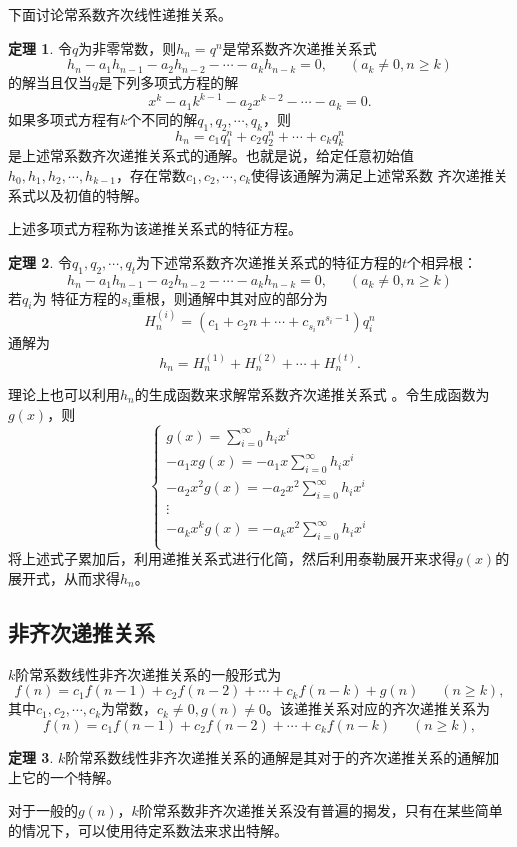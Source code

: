 \documentclass[a4paper,11pt]{article}%
\theoremstyle{remark}
\theoremstyle{remark}
\theoremstyle{definition}
\newtheorem{theorem}{定理}[section]
\theoremstyle{definition}
\theoremstyle{definition}
\begin{document}
下面讨论常系数齐次线性递推关系。
\begin{theorem}
   令$q$为非零常数，则$h_n=q^n$是常系数齐次递推关系式
   \[h_n-a_1h_{n-1}-a_2h_{n-2}-\cdots-a_kh_{n-k}=0,\phantom{111}(a_k\neq 0,n\geq k)\]
   的解当且仅当$q$是下列多项式方程的解
   \[x^k-a_1k^{k-1}-a_2x^{k-2}-\cdots-a_k=0.\] 
   如果多项式方程有$k$个不同的解$q_1,q_2,\cdots,q_k$，则 
   \[h_n=c_1q^n_1+c_2q^n_2+\cdots+c_kq^n_k\]
   是上述常系数齐次递推关系式的通解。也就是说，给定任意初始值$h_0,h_1,h_2,\cdots,h_{k-1}$，存在常数$c_1,c_2,\cdots,c_k$使得该通解为满足上述常系数
   齐次递推关系式以及初值的特解。
\end{theorem}
上述多项式方程称为该递推关系式的特征方程。
\begin{theorem}
    令$q_1,q_2,\cdots,q_t$为下述常系数齐次递推关系式的特征方程的$t$个相异根：
   \[h_n-a_1h_{n-1}-a_2h_{n-2}-\cdots-a_kh_{n-k}=0,\phantom{111}(a_k\neq 0,n\geq k)\]
   若$q_i$为 特征方程的$s_i$重根，则通解中其对应的部分为 
   \[H_n^{(i)}=(c_1+c_2n+\cdots +c_{s_i}n^{s_i-1})q_i^n\]
   通解为 
   \[h_n=H_n^{(1)}+H_n^{(2)}+\cdots+H_n^{(t)}.\]
\end{theorem}
理论上也可以利用$h_n$的生成函数来求解常系数齐次递推关系式 。令生成函数为$g(x)$，则
\[ 
    \begin{cases}
       g(x)= \sum_{i=0}^{\infty}h_ix^i\\ 
       -a_1xg(x)= -a_1x\sum_{i=0}^{\infty}h_ix^i\\ 
       -a_2x^2g(x)= -a_2x^2\sum_{i=0}^{\infty}h_ix^i\\ 
       \vdots\\
       -a_kx^kg(x)= -a_kx^2\sum_{i=0}^{\infty}h_ix^i\\ 
    \end{cases}\]
    将上述式子累加后，利用递推关系式进行化简，然后利用泰勒展开来求得$g(x)$的展开式，从而求得$h_n$。
\subsection{非齐次递推关系}$k$阶常系数线性非齐次递推关系的一般形式为
 \[f(n)=c_1f(n-1)+c_2f(n-2)+\cdots+c_kf(n-k)+g(n)\phantom{111}(n\geq k),\]
 其中$c_1,c_2,\cdots,c_k$为常数，$c_k\neq 0,g(n)\neq 0$。该递推关系对应的齐次递推关系为
 \[f(n)=c_1f(n-1)+c_2f(n-2)+\cdots+c_kf(n-k)\phantom{111}(n\geq k),\]
\begin{theorem}$k$阶常系数线性非齐次递推关系的通解是其对于的齐次递推关系的通解加上它的一个特解。
\end{theorem}
对于一般的$g(n)$，$k$阶常系数非齐次递推关系没有普遍的揭发，只有在某些简单的情况下，可以使用待定系数法来求出特解。
\end{document}
